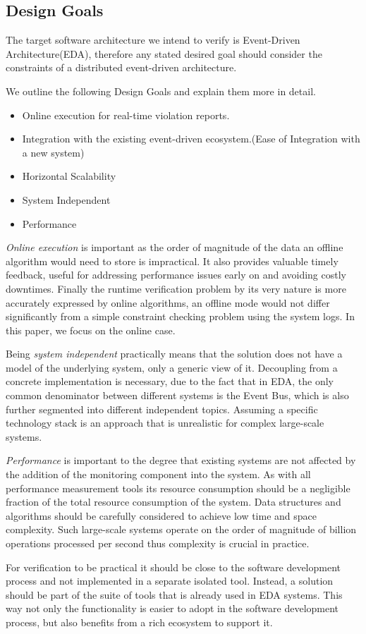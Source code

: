 \documentclass{article}
\begin{document}
\subsection{Design Goals}
The target software architecture we intend to verify is Event-Driven Architecture(EDA), therefore any stated desired goal
should consider the constraints of a distributed event-driven architecture.

We outline the following Design Goals and explain them more in detail.

\begin{itemize}
	\item Online execution for real-time violation reports.
	\item Integration with the existing event-driven ecosystem.(Ease of Integration with a new system)
	\item Horizontal Scalability
	\item System Independent
	\item Performance
\end{itemize}


\par
\emph{Online execution} is important as the order of magnitude of the data an offline algorithm would need to store is impractical.
It also provides valuable timely feedback, useful for addressing performance issues early on and avoiding costly downtimes.
Finally the runtime verification problem by its very nature is more accurately expressed by online algorithms, an offline mode
would not differ significantly from a simple constraint checking problem using the system logs. In this paper, we focus on the online case.
\par
Being \emph{system independent} practically means that the solution does not have a model of the underlying system, only a generic view of it.
Decoupling from a concrete implementation is necessary, due to the fact that in EDA, the only common denominator between different systems
is the Event Bus, which is also further segmented into different independent topics. Assuming a specific technology stack is an approach that
is unrealistic for complex large-scale systems.
\par
\emph{Performance} is important to the degree that existing systems are not affected by the addition of the monitoring component into the system.
As with all performance measurement tools its resource consumption should be a negligible fraction of the total resource consumption of the system.
Data structures and algorithms should be carefully considered to achieve low time and space complexity. Such large-scale systems operate on the order
of magnitude of billion operations processed per second thus complexity is crucial in practice.
\par
For verification to be practical it should be close to the software development process and not implemented in a separate isolated tool.
Instead, a solution should be part of the suite of tools that is already used in EDA systems. This way not only the functionality is
easier to adopt in the software development process, but also benefits from a rich ecosystem to support it.
\end{document}
